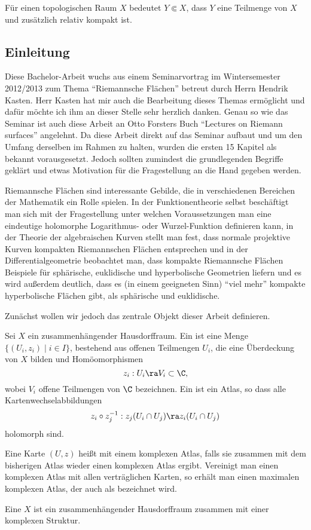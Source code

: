 Für einen topologischen Raum $X$ bedeutet $Y \Subset X$, dass $Y$
eine Teilmenge von $X$ und zusätzlich relativ kompakt ist.

\subsection{Einleitung}
\label{sec:einleitung}

Diese Bachelor-Arbeit wuchs aus einem Seminarvortrag im Wintersemester
2012/2013 zum Thema "`Riemannsche Flächen"' betreut durch Herrn Hendrik
Kasten. Herr Kasten hat mir auch die Bearbeitung dieses Themas
ermöglicht und dafür möchte ich ihm an dieser Stelle sehr herzlich
danken. Genau so wie das Seminar ist auch diese Arbeit an Otto Forsters
Buch "`Lectures on Riemann surfaces"' \cite{For} angelehnt. Da diese
Arbeit direkt auf das Seminar aufbaut und um den Umfang derselben im
Rahmen zu halten, wurden die ersten 15 Kapitel
als bekannt vorausgesetzt. Jedoch sollten zumindest die grundlegenden
Begriffe geklärt und etwas Motivation für die Fragestellung an
die Hand gegeben werden.

Riemannsche Flächen sind interessante Gebilde, die in verschiedenen
Bereichen der Mathematik ein Rolle spielen. In der Funktionentheorie
selbst beschäftigt man sich mit der Fragestellung unter welchen
Voraussetzungen man eine eindeutige holomorphe Logarithmus- oder
Wurzel-Funktion definieren kann, in der Theorie der algebraischen
Kurven stellt man fest, dass normale projektive Kurven
kompakten Riemannschen Flächen entsprechen und in der Differentialgeometrie
beobachtet man, dass kompakte Riemannsche Flächen Beispiele für
sphärische, euklidische und hyperbolische Geometrien liefern und es
wird außerdem deutlich, dass es (in einem geeigneten Sinn) "`viel
mehr"' kompakte hyperbolische Flächen gibt, als sphärische und euklidische.

Zunächst wollen wir jedoch das zentrale Objekt dieser Arbeit
definieren.

\begin{defin}
  \label{def:rf}
  Sei $X$ ein zusammenhängender Hausdorffraum. Ein 
  ist eine Menge $\{(U_i, z_i) \mid i \in I\}$, bestehend aus
  offenen Teilmengen $U_i$, die eine Überdeckung von $X$ bilden und
  Homöomorphismen
  \[
  z_i: U_i \ra V_i \subset \C,
  \]
  wobei $V_i$ offene Teilmengen von $\C$ bezeichnen. Ein
   ist ein Atlas, so dass alle
  Kartenwechselabbildungen
  \[
  z_i \circ z_j^{-1} : z_j(U_i \cap U_j) \ra z_i(U_i \cap U_j)
  \]
  holomorph sind.

  Eine Karte $(U,z)$ heißt  mit einem
  komplexen Atlas, falls sie zusammen mit dem bisherigen Atlas wieder
  einen komplexen Atlas ergibt. Vereinigt man einen komplexen Atlas mit allen
  verträglichen Karten, so erhält man einen maximalen komplexen
  Atlas, der auch als  bezeichnet wird.

  Eine  $X$ ist ein zusammenhängender
  Hausdorffraum zusammen mit einer komplexen Struktur.
\end{defin}

